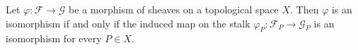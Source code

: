 Let $\varphi: \mathcal{F} \rightarrow \mathcal{G}$ be a morphism of sheaves on a topological space $X$. Then $\varphi$ is an isomorphism if and only if the induced map on the stalk $\varphi_P: \mathcal{F}_P \rightarrow \mathcal{G}_P$ is an isomorphism for every $P \in X$.
